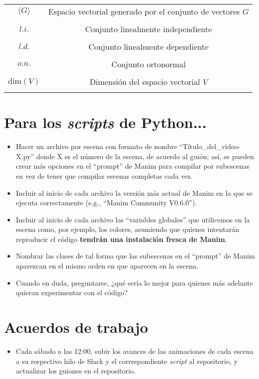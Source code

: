 \documentclass[12pt,dvipsnames]{article}
\numberwithin{equation}{section}
\begin{document}
\begin{tcolorbox}
\begin{tabular}{cc}
    $\langle G \rangle$ & Espacio vectorial generado por el conjunto de vectores $G$ \\ \\
    $l.i.$ & Conjunto linealmente independiente \\ \\
    $l.d.$ & Conjunto linealmente dependiente \\ \\
    $o.n.$ & Conjunto ortonormal \\ \\
    $\text{dim}(V)$ & Dimensión del espacio vectorial $V$ \\ \\

\end{tabular}
\end{tcolorbox}

\section{Para los \emph{scripts} de Python...}

\begin{itemize}
    \item Hacer un archivo por escena con formato de nombre ``Título\_del\_video-X.py'' donde X es el número de la escena, de acuerdo al guión; así, se pueden crear más opciones en el ``prompt'' de Manim para compilar por subescenas en vez de tener que compilar escenas completas cada vez.

    \item Incluir al inicio de cada archivo la versión más actual de Manim en la que se ejecuta correctamente (e.g., ``Manim Community V0.6.0'').
    
    \item Incluir al inicio de cada archivo las ``variables globales'' que utilicemos en la escena como, por ejemplo, los colores, asumiendo que quienes intentarán reproducir el código \textbf{tendrán una instalación fresca de Manim}.
    
    \item Nombrar las clases de tal forma que las subescenas en el ``prompt'' de Manim aparezcan en el mismo orden en que aparecen en la escena.
    
    \item Cuando en duda, preguntarse, ¿qué sería lo mejor para quienes más adelante quieran experimentar con el código?
    
\end{itemize}

\section{Acuerdos de trabajo}

\begin{itemize}
    \item Cada sábado a las 12:00, subir los avances de las animaciones de cada escena a su respectivo hilo de Slack y el correspondiente \emph{script} al repositorio, y actualizar los guiones en el repositorio.
\end{itemize}
\end{document}
